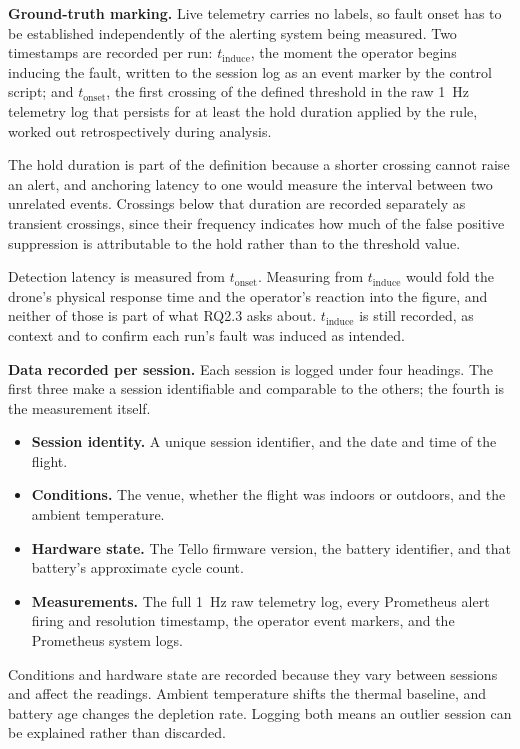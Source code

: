 \noindent\textbf{Ground-truth marking.} Live telemetry carries no labels, so
fault onset has to be established independently of the alerting system being
measured. Two timestamps are recorded per run: $t_{\text{induce}}$, the moment
the operator begins inducing the fault, written to the session log as an event
marker by the control script; and $t_{\text{onset}}$, the first crossing of the
defined threshold in the raw \SI{1}{\hertz} telemetry log that persists for at
least the hold duration applied by the rule, worked out retrospectively during
analysis.

The hold duration is part of the definition because a shorter crossing cannot
raise an alert, and anchoring latency to one would measure the interval between
two unrelated events. Crossings below that duration are recorded separately as
transient crossings, since their frequency indicates how much of the false
positive suppression is attributable to the hold rather than to the threshold
value.

Detection latency is measured from $t_{\text{onset}}$. Measuring from
$t_{\text{induce}}$ would fold the drone's physical response time and the
operator's reaction into the figure, and neither of those is part of what RQ2.3
asks about. $t_{\text{induce}}$ is still recorded, as context and to confirm each
run's fault was induced as intended.

\noindent\textbf{Data recorded per session.} Each session is logged under four
headings. The first three make a session identifiable and comparable to the
others; the fourth is the measurement itself.

\begin{itemize}
    \item \textbf{Session identity.} A unique session identifier, and the date
    and time of the flight.
    \item \textbf{Conditions.} The venue, whether the flight was indoors or
    outdoors, and the ambient temperature.
    \item \textbf{Hardware state.} The Tello firmware version, the battery
    identifier, and that battery's approximate cycle count.
    \item \textbf{Measurements.} The full \SI{1}{\hertz} raw telemetry log,
    every Prometheus alert firing and resolution timestamp, the operator event
    markers, and the Prometheus system logs.
\end{itemize}

Conditions and hardware state are recorded because they vary between sessions
and affect the readings. Ambient temperature shifts the thermal baseline, and
battery age changes the depletion rate. Logging both means an outlier session
can be explained rather than discarded.

